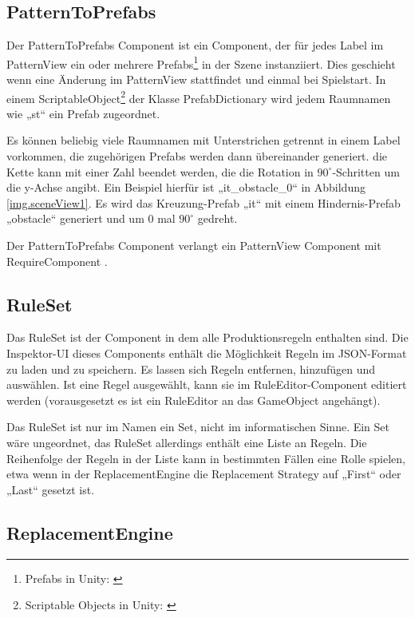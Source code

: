 \subsection{PatternToPrefabs}

Der PatternToPrefabs Component ist ein Component, der für jedes Label im PatternView ein oder mehrere Prefabs\footnote{Prefabs in Unity: \cite[Seite: LearningtheInterface]{unityManual}} in der Szene instanziiert. Dies geschieht wenn eine Änderung im PatternView stattfindet und einmal bei Spielstart. In einem ScriptableObject\footnote{Scriptable Objects in Unity: \cite[Seite: class-ScriptableObject]{unityManual}} der Klasse PrefabDictionary wird jedem Raumnamen wie „st“ ein Prefab zugeordnet. 

Es können beliebig viele Raumnamen mit Unterstrichen getrennt in einem Label vorkommen, die zugehörigen Prefabs werden dann übereinander generiert. die Kette kann mit einer Zahl beendet werden, die die Rotation in $90^\circ$-Schritten um die y-Achse angibt. Ein Beispiel hierfür ist „it\_obstacle\_0“ in Abbildung \ref{img.sceneView1}. Es wird das Kreuzung-Prefab „it“ mit einem Hindernis-Prefab „obstacle“ generiert und um 0 mal $90^\circ$ gedreht.

Der PatternToPrefabs Component verlangt ein PatternView Component mit RequireComponent \cite[Seite: RequireComponent]{unitySciptingReference}.

\subsection{RuleSet}

Das RuleSet ist der Component in dem alle Produktionsregeln enthalten sind. Die Inspektor-UI dieses Components enthält die Möglichkeit Regeln im JSON-Format zu laden und zu speichern. Es lassen sich Regeln entfernen, hinzufügen und auswählen. Ist eine Regel ausgewählt, kann sie im RuleEditor-Component editiert werden (vorausgesetzt es ist ein RuleEditor an das GameObject angehängt).

Das RuleSet ist nur im Namen ein Set, nicht im informatischen Sinne. Ein Set wäre ungeordnet, das RuleSet allerdings enthält eine Liste an Regeln. Die Reihenfolge der Regeln in der Liste kann in bestimmten Fällen eine Rolle spielen, etwa wenn in der ReplacementEngine die Replacement Strategy auf „First“ oder „Last“ gesetzt ist.

\subsection{ReplacementEngine}

